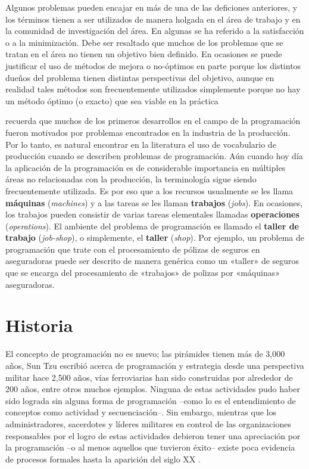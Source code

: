 \documentclass[draft,12pt,headsepline,footsepline,paper=letter]{scrreprt}
\begin{document}
Algunos problemas pueden encajar en más de una de las deficiones anteriores, y los términos tienen a ser utilizados de manera holgada en el área de trabajo y en la comunidad de investigación del área.
%
En algunas se ha referido a la satisfacción o a la minimización. Debe ser resaltado que muchos de los problemas que se tratan en el área no tienen un objetivo bien definido. En ocasiones se puede justificar el uso de métodos de mejora o no-óptimos en parte porque los distintos dueños del problema tienen distintas perspectivas del objetivo, aunque en realidad tales métodos son frecuentemente utilizados simplemente porque no hay un método óptimo (o exacto) que sea viable en la práctica \citep[p.~53,~54]{wren95scheduling-timetabling}

\citet[p.~3]{Baker2009} recuerda que muchos de los primeros desarrollos en el campo de la programación fueron motivados por problemas encontrados en la industria de la producción. Por lo tanto, es natural encontrar en la literatura el uso de vocabulario de producción cuando se describen problemas de programación. Aún cuando hoy día la aplicación de la programación es de considerable importancia en múltiples áreas no relacionadas con la producción, la terminología sigue siendo frecuentemente utilizada. Es por eso que a los recursos usualmente se les llama \textbf{máquinas} (\textit{machines}) y a las tareas se les llaman \textbf{trabajos} (\textit{jobs}). En ocasiones, los trabajos pueden consistir de varias tareas elementales llamadas \textbf{operaciones} (\textit{operations}). El ambiente del problema de programación es llamado el \textbf{taller de trabajo} (\textit{job-shop}), o simplemente, el \textbf{taller} (\textit{shop}). Por ejemplo, un problema de programación que trate con el procesamiento de pólizas de seguros en aseguradoras puede ser descrito de manera genérica como un «taller» de seguros que se encarga del procesamiento de «trabajos» de polizas por «máquinas» aseguradoras.

\section{Historia}
\label{historia_programacion}

El concepto de programación no es nuevo; las pirámides tienen más de 3,000 años, Sun Tzu escribió acerca de programación y estrategia desde una perspectiva militar hace 2,500 años, vías ferroviarias han sido construidas por alrededor de 200 años, entre otros muchos ejemplos. Ninguna de estas actividades pudo haber sido lograda sin alguna forma de programación –como lo es el entendimiento de conceptos como actividad y secuenciación–. Sin embargo, mientras que los administradores, sacerdotes y líderes militares en control de las organizaciones responsables por el logro de estas actividades debieron tener una apreciación por la programación –o al menos aquellos que tuvieron éxito– existe poca evidencia de procesos formales hasta la aparición del siglo XX \citep[p.~2]{Weaver2006}.
\end{document}
